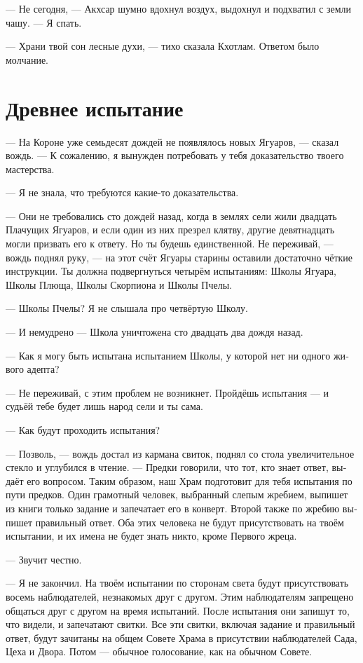 \documentclass[a4paper,12pt,fleqn]{book}\usepackage{cooltooltips}\usepackage{polyglossia}\setdefaultlanguage{russian}\setotherlanguage{english}\defaultfontfeatures{Ligatures=TeX,Mapping=tex-text} \usepackage{xcolor}\definecolor{lightgray}{HTML}{bbbbbb}\color{lightgray}\newcommand{\ml}[3]{\textenglish{\textcolor{black}{#3}}}
\begin{document}
--- Не сегодня, --- Акхсар шумно вдохнул воздух, выдохнул и подхватил с земли чашу.
--- Я спать.

--- Храни твой сон лесные духи, --- тихо сказала Кхотлам.
Ответом было молчание.

\section{Древнее испытание}

--- На Короне уже семьдесят дождей не появлялось новых Ягуаров, --- сказал вождь.
--- К сожалению, я вынужден потребовать у тебя доказательство твоего мастерства.

--- Я не знала, что требуются какие-то доказательства.

--- Они не требовались сто дождей назад, когда в землях сели жили двадцать Плачущих Ягуаров, и если один из них презрел клятву, другие девятнадцать могли призвать его к ответу.
Но ты будешь единственной.
Не переживай, --- вождь поднял руку, --- на этот счёт Ягуары старины оставили достаточно чёткие инструкции.
Ты должна подвергнуться четырём испытаниям: Школы Ягуара, Школы Плюща, Школы Скорпиона и Школы Пчелы.

--- Школы Пчелы?
Я не слышала про четвёртую Школу.

--- И немудрено --- Школа уничтожена сто двадцать два дождя назад.

--- Как я могу быть испытана испытанием Школы, у которой нет ни одного живого адепта?

--- Не переживай, с этим проблем не возникнет.
Пройдёшь испытания --- и судьёй тебе будет лишь народ сели и ты сама.

--- Как будут проходить испытания?

--- Позволь, --- вождь достал из кармана свиток, поднял со стола увеличительное стекло и углубился в чтение.
--- Предки говорили, что тот, кто знает ответ, выдаёт его вопросом.
Таким образом, наш Храм подготовит для тебя испытания по пути предков.
Один грамотный человек, выбранный слепым жребием, выпишет из книги только задание и запечатает его в конверт.
Второй также по жребию выпишет правильный ответ.
Оба этих человека не будут присутствовать на твоём испытании, и их имена не будет знать никто, кроме Первого жреца.

--- Звучит честно.

--- Я не закончил.
На твоём испытании по сторонам света будут присутствовать восемь наблюдателей, незнакомых друг с другом.
Этим наблюдателям запрещено общаться друг с другом на время испытаний.
После испытания они запишут то, что видели, и запечатают свитки.
Все эти свитки, включая задание и правильный ответ, будут зачитаны на общем Совете Храма в присутствии наблюдателей Сада, Цеха и Двора.
Потом --- обычное голосование, как на обычном Совете.
\end{document}
